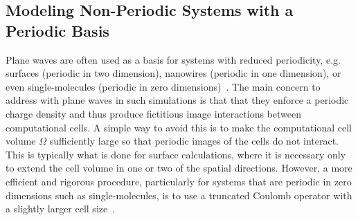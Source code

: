 \documentclass[superscriptaddress,aps,pra,nofootinbib,notitlepage,10pt,longbibliography]{revtex4-1}
\begin{document}
\subsection{Modeling Non-Periodic Systems with a Periodic Basis}
\label{app:image_error}

Plane waves are often used as a basis for systems with reduced periodicity, e.g. surfaces (periodic in two dimension), nanowires (periodic in one dimension), or even single-molecules (periodic in zero dimensions)~\cite{marx2009ab}. The main concern to address with plane waves in such simulations is that that they enforce a periodic charge density and thus produce fictitious image interactions between computational cells.
A simple way to avoid this is to make the computational cell volume $\Omega$ sufficiently large so that periodic images of the cells do not interact. This is typically what is done for surface calculations, where it is necessary only to extend the cell volume in one or two of the spatial directions. However, a more efficient and rigorous procedure, particularly for systems that are periodic in zero dimensions such as single-molecules, is to use a truncated Coulomb operator with a slightly larger cell size~\cite{rozzi2006exact,sundararaman2013regularization,ismail2006truncation}.
\end{document}
